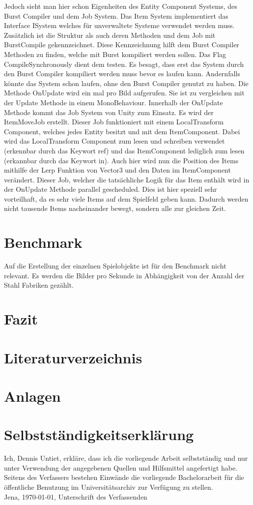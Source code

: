 \documentclass[12pt, titlepage]{article}
\begin{document}
Jedoch sieht man hier schon Eigenheiten des Entity Component Systems, des Burst Compiler und dem Job System. Das Item System implementiert das Interface ISystem welches für unverwaltete Systeme verwendet werden muss. Zusätzlich ist die Struktur als auch deren Methoden und dem Job mit BurstCompile gekennzeichnet. Diese Kennzeichnung hilft dem Burst Compiler Methoden zu finden, welche mit Burst kompiliert werden sollen. Das Flag CompileSynchronously dient dem testen. Es besagt, dass erst das System durch den Burst Compiler kompiliert werden muss bevor es laufen kann. Andernfalls könnte das System schon laufen, ohne den Burst Compiler genutzt zu haben. Die Methode OnUpdate wird ein mal pro Bild aufgerufen. Sie ist zu vergleichen mit der Update Methode in einem MonoBehaviour. Innerhalb der OnUpdate Methode kommt das Job System von Unity zum Einsatz. Es wird der ItemMoveJob erstellt. Dieser Job funktioniert mit einem LocalTransform Component, welches jedes Entity besitzt und mit dem ItemComponent. Dabei wird das LocalTransform Component zum lesen und schreiben verwendet (erkennbar durch das Keywort ref) und das ItemComponent lediglich zum lesen (erkannbar durch das Keywort in). Auch hier wird nun die Position des Items mithilfe der Lerp Funktion von Vector3 und den Daten im ItemComponent verändert. Dieser Job, welcher die tatsächliche Logik für das Item enthält wird in der OnUpdate Methode parallel gescheduled. Dies ist hier speziell sehr vorteilhaft, da es sehr viele Items auf dem Spielfeld geben kann. Dadurch werden nicht tausende Items nacheinander bewegt, sondern alle zur gleichen Zeit.
\newpage
\section{Benchmark}
Auf die Erstellung der einzelnen Spielobjekte ist für den Benchmark nicht relevant. Es werden die Bilder pro Sekunde in Abhängigkeit von der Anzahl der Stahl Fabriken gezählt. 
\newpage
\section{Fazit}
\newpage
\section{Literaturverzeichnis}



\newpage
\section{Anlagen}
\newpage
\section{Selbstständigkeitserklärung}
Ich, Dennis Untiet, erkläre, dass ich die vorliegende Arbeit selbstständig und nur unter Verwendung der
angegebenen Quellen und Hilfsmittel angefertigt habe.\\
Seitens des Verfassers bestehen Einwände die vorliegende Bachelorarbeit für die öffentliche Benutzung im
Universitätsarchiv zur Verfügung zu stellen.\\
Jena, \today, Unterschrift des Verfassenden
\end{document}
